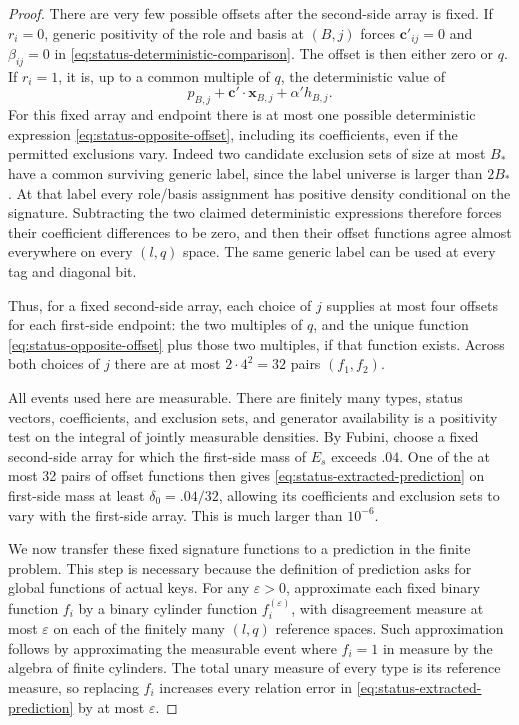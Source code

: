 \begin{proof}
There are very few possible offsets after the second-side array is
fixed. If $r_i=0$, generic positivity of the role and basis at $(B,j)$
forces $\mathbf c'_{ij}=0$ and $\beta_{ij}=0$ in
\eqref{eq:status-deterministic-comparison}. The offset is then either
zero or $q$. If $r_i=1$, it is, up to a common multiple of $q$, the
deterministic value of
\begin{equation}
\label{eq:status-opposite-offset}
p_{B,j}+\mathbf c'\cdot\mathbf x_{B,j}+\alpha' h_{B,j}.
\end{equation}
For this fixed array and endpoint there is at most one possible
deterministic expression \eqref{eq:status-opposite-offset}, including
its coefficients, even if the permitted exclusions vary. Indeed two
candidate exclusion sets of size at most $B_*$ have a common surviving
generic label, since the label universe is larger than $2B_*$. At that
label every role/basis assignment has positive density conditional on
the signature. Subtracting the two claimed deterministic expressions
therefore forces their coefficient differences to be zero, and then
their offset functions agree almost everywhere on every $(l,q)$ space.
The same generic label can be used at every tag and diagonal bit.

Thus, for a fixed second-side array, each choice of $j$ supplies at most
four offsets for each first-side endpoint: the two multiples of $q$,
and the unique function \eqref{eq:status-opposite-offset} plus those
two multiples, if that function exists. Across both choices of $j$
there are at most $2\cdot4^2=32$ pairs $(f_1,f_2)$.

All events used here are measurable. There are finitely many types,
status vectors, coefficients, and exclusion sets, and generator
availability is a positivity test on the integral of jointly
measurable densities. By Fubini, choose a fixed second-side array for
which the first-side mass of $E_s$ exceeds $.04$. One of the at most
32 pairs of offset functions then gives
\eqref{eq:status-extracted-prediction} on first-side mass at least
$\delta_0=.04/32$, allowing its coefficients and exclusion sets to vary
with the first-side array. This is much larger than $10^{-6}$.

We now transfer these fixed signature functions to a prediction in the
finite problem. This step is necessary because the definition of
prediction asks for global functions of actual keys. For any
$\varepsilon>0$, approximate each fixed binary function $f_i$ by a
binary cylinder function $f_i^{(\varepsilon)}$, with disagreement
measure at most $\varepsilon$ on each of the finitely many $(l,q)$
reference spaces. Such approximation follows by approximating the
measurable event where $f_i=1$ in measure by the algebra of finite
cylinders. The total unary measure of every type is its reference
measure, so replacing $f_i$ increases every relation error in
\eqref{eq:status-extracted-prediction} by at most $\varepsilon$.


\end{proof}
